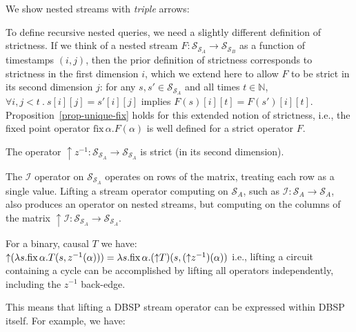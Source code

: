 \documentclass[twocolumn
]{svjour3}
\numberwithin{equation}{section}
\newcommand{\dbsp}{DBSP\xspace}
\newcommand{\N}{\mathbb{N}}  %
\newcommand{\stream}[1]{\ensuremath{\mathcal{S}_{#1}}}
\newcommand{\zm}{\ensuremath{z^{-1}}} %
\newcommand{\I}{\mathcal{I}}  %
\newcommand{\I}{\mathit{I}}  %
\newcommand{\fix}[2]{\mbox{fix}\,#1.#2}
\newcommand{\lift}[1]{{\uparrow}#1}
\begin{document}
We show nested streams with \emph{triple} arrows:

\begin{center}
\end{center}

To define recursive nested queries, we need a slightly different
definition of strictness.  If we think of a nested stream $F:
\stream{\stream{A}} \to \stream{\stream{B}}$ as a function of
timestamps $(i, j)$, then the prior definition of strictness
corresponds to strictness in the first dimension $i$, which we extend
here to allow $F$ to be strict in its second dimension $j$: for any
$s, s' \in \stream{\stream{A}}$ and all times $t \in \N$, $\forall i,
j < t~.~s[i][j] = s'[i][j]$ implies $F(s)[i][t] = F(s')[i][t]$.
Proposition~\ref{prop-unique-fix} holds for this extended notion of
strictness, i.e., the fixed point operator $\fix{\alpha}{F(\alpha)}$
is well defined for a strict operator $F$.

\begin{proposition}\label{prop-liftz}
The operator $\lift{\zm}: \stream{\stream{A}} \to \stream{\stream{A}}$ is strict (in its second dimension).
\end{proposition}

The $\I$ operator on $\stream{\stream{A}}$ operates on rows of the
matrix, treating each row as a single value.  Lifting a stream
operator computing on $\stream{A}$, such as $\I: \stream{A} \to
\stream{A}$, also produces an operator on nested streams, but
computing on the columns of the matrix $\lift{\I}: \stream{\stream{A}}
\to \stream{\stream{A}}.$

\begin{proposition}
\label{prop-lift-cycle}
For a binary, causal $T$ we have: $\lift{(\lambda
  s. \fix{\alpha}{T(s,\zm(\alpha)}))} = \\ \lambda
s. \fix{\alpha}{(\lift{T})(s,(\lift{\zm})(\alpha))}$
\noindent i.e., lifting a circuit containing a cycle can be
accomplished by lifting all operators independently, including the
$\zm$ back-edge.
\end{proposition}

This means that lifting a \dbsp stream operator can be expressed within \dbsp
itself.  For example, we have:
\end{document}
